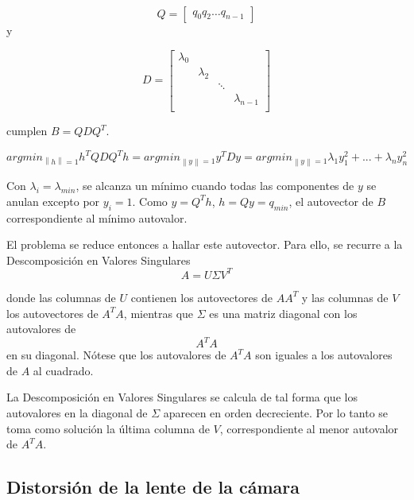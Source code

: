 \documentclass[a4paper,10pt]{article}
\newcommand{\norm}[1]{\left\lVert#1\right\rVert}
\begin{document}
\begin{equation}
    Q = \begin{bmatrix}
            q_{0} q_{2} \dots q_{n-1}
        \end{bmatrix}
\end{equation}
y

\begin{equation}
    D = \begin{bmatrix}
            \lambda_{0} & & & \\
                        & \lambda_{2} & & \\
                        & & \ddots & \\
                        & & & \lambda_{n-1}\\
        \end{bmatrix}
\end{equation}

cumplen $B = QDQ^{T}$.

\begin{equation}
    argmin_{\norm{h}=1} h^{T}QDQ^{T}h = argmin_{\norm{y}=1} y^{T}Dy = argmin_{\norm{y}=1} \lambda_{1}y^{2}_{1} + ... + \lambda_{n}y^{2}_{n}
\end{equation}

Con $\lambda_{i} = \lambda_{min}$, se alcanza un mínimo cuando todas las componentes de $y$ se anulan excepto por $y_{i} = 1$. Como $y = Q^{T}h$,
$h=Qy = q_{min}$, el autovector de $B$ correspondiente al mínimo autovalor.

El problema se reduce entonces a hallar este autovector. Para ello, se recurre a la Descomposición en Valores Singulares
\begin{equation}
    A = U\Sigma V^{T}
\end{equation}

donde las columnas de $U$ contienen los autovectores de $AA^{T}$ y las columnas de $V$ los autovectores de $A^{T}A$, mientras que $\Sigma$ es una matriz
diagonal con los autovalores de $$A^{T}A$$ en su diagonal. Nótese que los autovalores de $A^{T}A$ son iguales a los autovalores de $A$ al cuadrado.

La Descomposición en Valores Singulares se calcula de tal forma que los autovalores en la diagonal de $\Sigma$ aparecen en orden decreciente. Por lo tanto
se toma como solución la última columna de $V$, correspondiente al menor autovalor de $A^{T}A$.

\subsection{Distorsión de la lente de la cámara}
\end{document}
